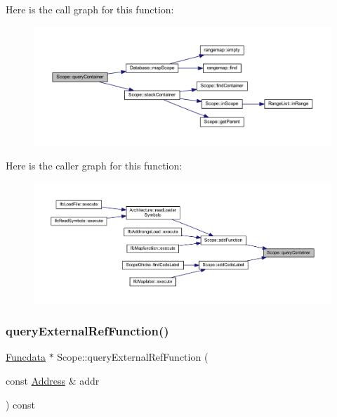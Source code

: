 Here is the call graph for this function\+:
\nopagebreak
\begin{figure}[H]
\begin{center}
\leavevmode
\includegraphics[width=350pt]{class_scope_af50dcbdbad011571fc24398781a2bab2_cgraph}
\end{center}
\end{figure}
Here is the caller graph for this function\+:
\nopagebreak
\begin{figure}[H]
\begin{center}
\leavevmode
\includegraphics[width=350pt]{class_scope_af50dcbdbad011571fc24398781a2bab2_icgraph}
\end{center}
\end{figure}
\mbox{\label{class_scope_a7850e4fd00c5dcc9299e646d13aae3dc}} 
\subsubsection{\texorpdfstring{queryExternalRefFunction()}{queryExternalRefFunction()}}
{\footnotesize\ttfamily \mbox{\hyperlink{class_funcdata}{Funcdata}} $\ast$ Scope\+::query\+External\+Ref\+Function (\begin{DoxyParamCaption}\item[{const \mbox{\hyperlink{class_address}{Address}} \&}]{addr }\end{DoxyParamCaption}) const}



